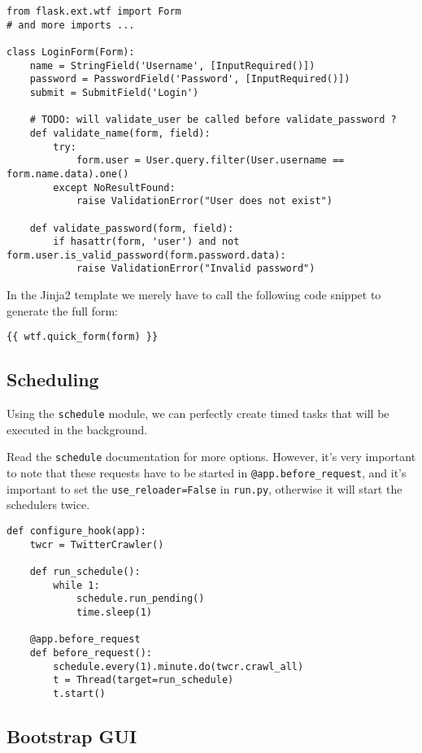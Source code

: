 \documentclass[../main/main.tex]{subfiles}
\begin{document}
\begin{lstlisting}
from flask.ext.wtf import Form
# and more imports ... 

class LoginForm(Form):
    name = StringField('Username', [InputRequired()])
    password = PasswordField('Password', [InputRequired()])
    submit = SubmitField('Login')

    # TODO: will validate_user be called before validate_password ?
    def validate_name(form, field):
        try:
            form.user = User.query.filter(User.username == form.name.data).one()
        except NoResultFound:
            raise ValidationError("User does not exist")

    def validate_password(form, field):
        if hasattr(form, 'user') and not form.user.is_valid_password(form.password.data):
            raise ValidationError("Invalid password")
\end{lstlisting}

In the Jinja2 template we merely have to call the following code snippet
to generate the full form: 

\begin{lstlisting}
{{ wtf.quick_form(form) }}
\end{lstlisting}

\subsection{Scheduling}

Using the \lstinline|schedule| module, we can perfectly create timed tasks that
will be executed in the background. 

Read the \lstinline|schedule| documentation for more options. However, it's very
important to note that these requests have to be started in
\lstinline|@app.before_request|, and it's important to set the
\lstinline|use_reloader=False| in \lstinline|run.py|, otherwise it will start
the schedulers twice. 

\begin{lstlisting}
def configure_hook(app):
    twcr = TwitterCrawler()

    def run_schedule():
        while 1:
            schedule.run_pending()
            time.sleep(1)

    @app.before_request
    def before_request():
        schedule.every(1).minute.do(twcr.crawl_all)
        t = Thread(target=run_schedule)
        t.start()
\end{lstlisting}

\subsection{Bootstrap GUI}
\end{document}
